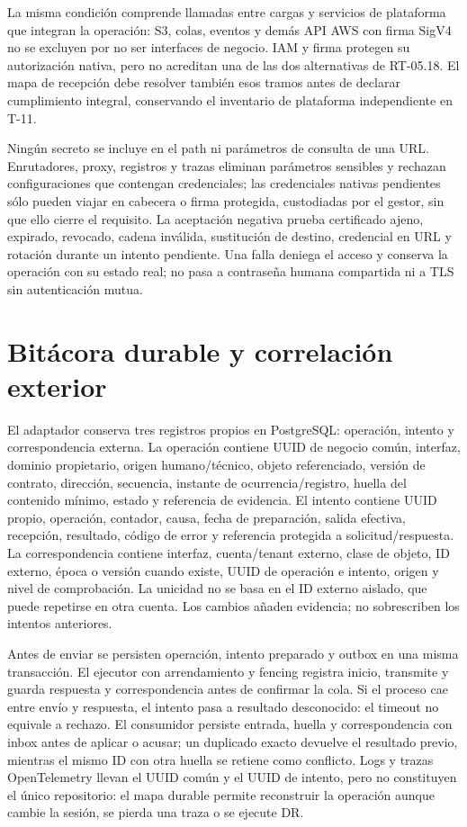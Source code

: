 La misma condición comprende llamadas entre cargas y servicios de plataforma que integran la operación: S3, colas, eventos y demás API AWS con firma SigV4 no se excluyen por no ser interfaces de negocio. IAM y firma protegen su autorización nativa, pero no acreditan una de las dos alternativas de RT-05.18. El mapa de recepción debe resolver también esos tramos antes de declarar cumplimiento integral, conservando el inventario de plataforma independiente en T-11.

Ningún secreto se incluye en el path ni parámetros de consulta de una URL. Enrutadores, proxy, registros y trazas eliminan parámetros sensibles y rechazan configuraciones que contengan credenciales; las credenciales nativas pendientes sólo pueden viajar en cabecera o firma protegida, custodiadas por el gestor, sin que ello cierre el requisito. La aceptación negativa prueba certificado ajeno, expirado, revocado, cadena inválida, sustitución de destino, credencial en URL y rotación durante un intento pendiente. Una falla deniega el acceso y conserva la operación con su estado real; no pasa a contraseña humana compartida ni a TLS sin autenticación mutua.

\section*{Bitácora durable y correlación exterior}
\label{sec:a42-correlacion}

El adaptador conserva tres registros propios en PostgreSQL: operación, intento y correspondencia externa. La operación contiene UUID de negocio común, interfaz, dominio propietario, origen humano/técnico, objeto referenciado, versión de contrato, dirección, secuencia, instante de ocurrencia/registro, huella del contenido mínimo, estado y referencia de evidencia. El intento contiene UUID propio, operación, contador, causa, fecha de preparación, salida efectiva, recepción, resultado, código de error y referencia protegida a solicitud/respuesta. La correspondencia contiene interfaz, cuenta/tenant externo, clase de objeto, ID externo, época o versión cuando existe, UUID de operación e intento, origen y nivel de comprobación. La unicidad no se basa en el ID externo aislado, que puede repetirse en otra cuenta. Los cambios añaden evidencia; no sobrescriben los intentos anteriores.

Antes de enviar se persisten operación, intento preparado y outbox en una misma transacción. El ejecutor con arrendamiento y fencing registra inicio, transmite y guarda respuesta y correspondencia antes de confirmar la cola. Si el proceso cae entre envío y respuesta, el intento pasa a resultado desconocido: el timeout no equivale a rechazo. El consumidor persiste entrada, huella y correspondencia con inbox antes de aplicar o acusar; un duplicado exacto devuelve el resultado previo, mientras el mismo ID con otra huella se retiene como conflicto. Logs y trazas OpenTelemetry llevan el UUID común y el UUID de intento, pero no constituyen el único repositorio: el mapa durable permite reconstruir la operación aunque cambie la sesión, se pierda una traza o se ejecute DR.

